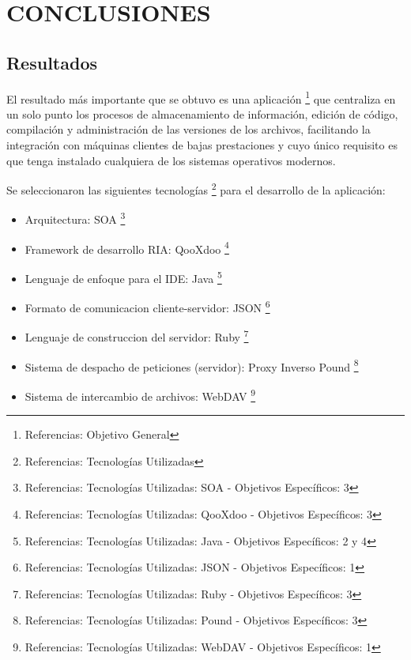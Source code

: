 \section{CONCLUSIONES}

\subsection{Resultados}

El resultado más importante que se obtuvo es una aplicación \footnote {Referencias: Objetivo General} que centraliza en un solo punto los procesos de almacenamiento de información, edición de código, compilación y administración de las versiones de los archivos, facilitando la integración con máquinas clientes de bajas prestaciones y cuyo único requisito es que tenga instalado cualquiera de los sistemas operativos modernos.

Se seleccionaron las siguientes tecnologías \footnote {Referencias: Tecnologías Utilizadas} para el desarrollo de la aplicación:

\begin{itemize}
	
	\item Arquitectura: SOA
	\footnote {Referencias: Tecnologías Utilizadas: SOA - Objetivos Específicos: 3}
	
	\item Framework de desarrollo RIA: QooXdoo
	\footnote {Referencias: Tecnologías Utilizadas: QooXdoo - Objetivos Específicos: 3}
	
	\item Lenguaje de enfoque para el IDE: Java
	\footnote {Referencias: Tecnologías Utilizadas: Java - Objetivos Específicos: 2 y 4}
	
	\item Formato de comunicacion cliente-servidor: JSON
	\footnote {Referencias: Tecnologías Utilizadas: JSON - Objetivos Específicos: 1}
	
	\item Lenguaje de construccion del servidor: Ruby
	\footnote {Referencias: Tecnologías Utilizadas: Ruby - Objetivos Específicos: 3}
	
	\item Sistema de despacho de peticiones (servidor): Proxy Inverso Pound
	\footnote {Referencias: Tecnologías Utilizadas: Pound - Objetivos Específicos: 3}
	
	\item Sistema de intercambio de archivos: WebDAV
	\footnote {Referencias: Tecnologías Utilizadas: WebDAV - Objetivos Específicos: 1}
	
\end{itemize}


